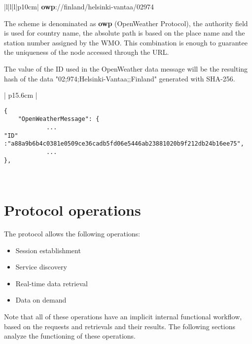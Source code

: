 \begin{table}[H]
\centering
\begin{tabular}{|l|l|l|p{10cm}|}
\hline
\textbf{owp}://finland/helsinki-vantaa/02974\\
\hline
\end{tabular}
\caption{ID's partially based in \protect \gls{CWOP}'s identification system.}
\end{table}

The scheme is denominated as \textbf{owp} (OpenWeather Protocol), the authority field is used for country name, the absolute path is based on the place name and the station number assigned by the \gls{WMO}. This combination is enough to guarantee the uniqueness of the node accessed through the \gls{URL}.

The value of the ID used in the OpenWeather data message will be the resulting hash of the data "02;974;Helsinki-Vantaa;;Finland" generated with \gls{SHA}-256.

\begin{table}[H]
\centering
\begin{tabular}{| p{15.6cm} |}\hline
\begin{minipage}[t]{\linewidth}
	\begin{verbatim}
{
    "OpenWeatherMessage": {
            ...
"ID" :"a88a9b6b4c0381e0509ce36cadb5fd06e5446ab23881020b9f212db24b16ee75",
            ...
},
      \end{verbatim}
\end{minipage} \\
\hline
\end{tabular}
\caption{IDs based in the \protect \gls{SHA}-256 result of the \protect \gls{CWOP} notation.}
\end{table}

\section{Protocol operations}

The protocol allows the following operations:

\begin{itemize}
\item Session establishment
\item Service discovery
\item Real-time data retrieval
\item Data on demand
\end{itemize}

Note that all of these operations have an implicit internal functional workflow, based on the requests and retrievals and their results. The following sections analyze the functioning of these operations.

